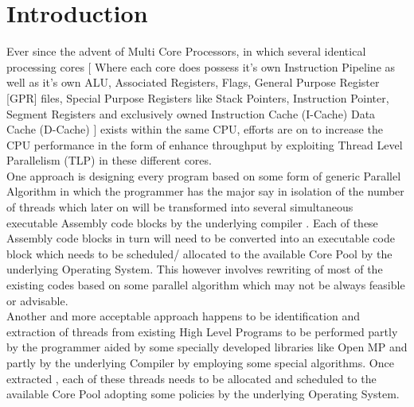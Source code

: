 \documentclass[a4paper,12pt]{article}
\begin{document}
\section{Introduction}
Ever since the advent of Multi Core Processors, in which several identical processing cores [ Where each core does possess it’s own Instruction Pipeline as well as it’s own ALU, Associated Registers, Flags, General Purpose Register [GPR] files, Special Purpose Registers like Stack Pointers, Instruction Pointer, Segment Registers and exclusively owned Instruction Cache (I-Cache) Data Cache (D-Cache) ] exists within the same CPU, efforts are on to increase the CPU performance in the form of enhance throughput by exploiting Thread Level Parallelism (TLP) in these different cores.
\\
One approach is designing every program based on some form of generic Parallel Algorithm in which the programmer has the major say in isolation of the number of threads which later on will be transformed into several simultaneous executable Assembly code blocks by the underlying compiler . Each of these Assembly code blocks in turn will need to be converted into an executable code block which needs to be scheduled/ allocated to the available Core Pool by the underlying Operating System. This however involves rewriting of most of the existing codes based on some parallel algorithm which may not be always feasible or advisable. 
\\
Another and more acceptable approach happens to be identification and extraction of threads from existing High Level Programs to be performed partly by the programmer aided by some specially developed libraries like Open MP and partly by the underlying Compiler by employing some special algorithms. Once extracted , each of these threads needs to be allocated and scheduled to the available Core Pool adopting some policies by the underlying Operating System.
\end{document}

